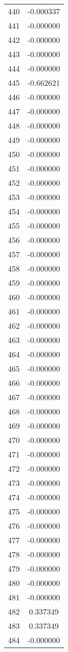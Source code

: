 \documentclass[12pt]{article}
\begin{document}
\begin{longtable}{@{}cc@{}}
440 & -0.000337 \\
441 & -0.000000 \\
442 & -0.000000 \\
443 & -0.000000 \\
444 & -0.000000 \\
445 & -0.662621 \\
446 & -0.000000 \\
447 & -0.000000 \\
448 & -0.000000 \\
449 & -0.000000 \\
450 & -0.000000 \\
451 & -0.000000 \\
452 & -0.000000 \\
453 & -0.000000 \\
454 & -0.000000 \\
455 & -0.000000 \\
456 & -0.000000 \\
457 & -0.000000 \\
458 & -0.000000 \\
459 & -0.000000 \\
460 & -0.000000 \\
461 & -0.000000 \\
462 & -0.000000 \\
463 & -0.000000 \\
464 & -0.000000 \\
465 & -0.000000 \\
466 & -0.000000 \\
467 & -0.000000 \\
468 & -0.000000 \\
469 & -0.000000 \\
470 & -0.000000 \\
471 & -0.000000 \\
472 & -0.000000 \\
473 & -0.000000 \\
474 & -0.000000 \\
475 & -0.000000 \\
476 & -0.000000 \\
477 & -0.000000 \\
478 & -0.000000 \\
479 & -0.000000 \\
480 & -0.000000 \\
481 & -0.000000 \\
482 & 0.337349 \\
483 & 0.337349 \\
484 & -0.000000 \\

\end{longtable}
\end{document}
